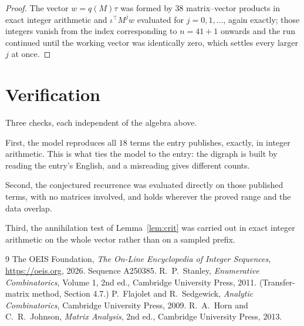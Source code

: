 \documentclass[11pt,a4paper]{article}
\theoremstyle{plain}
\theoremstyle{definition}
\begin{document}
\begin{proof}
The vector $w=q(M)\tau$ was formed by $38$ matrix--vector products in exact integer
arithmetic and $\iota^{\!\top}M^{j}w$ evaluated for $j=0,1,\dots$, again exactly; those
integers vanish from the index corresponding to $n=41+1$ onwards and the run continued
until the working vector was identically zero, which settles every larger $j$ at once.
\end{proof}

\section{Verification}

Three checks, each independent of the algebra above.

First, the model reproduces all $18$ terms the entry publishes, exactly, in integer
arithmetic. This is what ties the model to the entry: the digraph is built by reading the
entry's English, and a misreading gives different counts.

Second, the conjectured recurrence was evaluated directly on those published terms, with no
matrices involved, and holds wherever the proved range and the data overlap.

Third, the annihilation test of Lemma~\ref{lem:crit} was carried out in exact integer
arithmetic on the whole vector rather than on a sampled prefix.

\begin{thebibliography}{9}
 The OEIS Foundation, \emph{The On-Line Encyclopedia of Integer
Sequences}, \url{https://oeis.org}, 2026. Sequence A250385.
 R.~P.~Stanley, \emph{Enumerative Combinatorics}, Volume 1, 2nd ed.,
Cambridge University Press, 2011. (Transfer-matrix method, Section 4.7.)
 P.~Flajolet and R.~Sedgewick, \emph{Analytic Combinatorics}, Cambridge
University Press, 2009.
 R.~A.~Horn and C.~R.~Johnson, \emph{Matrix Analysis}, 2nd ed., Cambridge
University Press, 2013.
\end{thebibliography}
\end{document}
